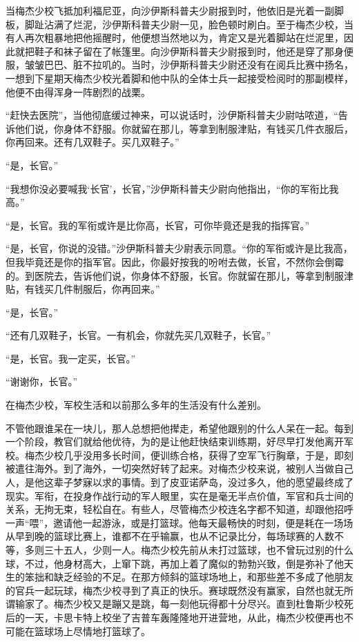     当梅杰少校飞抵加利福尼亚，向沙伊斯科普夫少尉报到时，他依旧是光着一副脚板，脚趾沾满了烂泥，沙伊斯科普夫少尉一见，脸色顿时刷白。至于梅杰少校，当有人再次粗暴地把他摇醒时，他便想当然地以为，肯定又是光着脚站在烂泥里，因此就把鞋子和袜子留在了帐篷里。向沙伊斯科普夫少尉报到时，他还是穿了那身便服，皱皱巴巴、脏不拉叽的。当时，沙伊斯科普夫少尉还没有在阅兵比赛中扬名，一想到下星期天梅杰少校光着脚和他中队的全体士兵一起接受检阅时的那副模样，他便不由得浑身一阵剧烈的战栗。

    “赶快去医院”，当他彻底缓过神来，可以说话时，沙伊斯科普夫少尉咕哝道，“告诉他们说，你身体不舒服。你就留在那儿，等拿到制服津贴，有钱买几件衣服后，你再回来。还有几双鞋子。买几双鞋子。”

    “是，长官。”

    “我想你没必要喊我‘长官’，长官，”沙伊斯科普夫少尉向他指出，“你的军衔比我高。”

    “是，长官。我的军衔或许是比你高，长官，可你毕竟还是我的指挥官。”

    “是，长官，你说的没错。”沙伊斯科普夫少尉表示同意。“你的军衔或许是比我高，但我毕竟还是你的指军官。因此，你最好按我的吩咐去做，长官，不然你会倒霉的。到医院去，告诉他们说，你身体不舒服，长官。你就留在那儿，等拿到制服津贴，有钱买几件制服后，你再回来。”

    “是，长官。”

    “还有几双鞋子，长官。一有机会，你就先买几双鞋子，长官。”

    “是，长官。我一定买，长官。”

    “谢谢你，长官。”

    在梅杰少校，军校生活和以前那么多年的生活没有什么差别。

    不管他跟谁呆在一块儿，那人总想把他撵走，希望他跟别的什么人呆在一起。每到一个阶段，教官们就给他优待，为的是让他赶快结束训练期，好尽早打发他离开军校。梅杰少校几乎没用多长时间，便训练合格，获得了空军飞行胸章，于是，即刻被遣往海外。到了海外，一切突然好转了起来。对梅杰少校来说，被别人当做自己人，是他这辈子梦寐以求的事情。到了皮亚诺萨岛，没过多久，他的愿望最终成了现实。军衔，在投身作战行动的军人眼里，实在是毫无半点价值，军官和兵士间的关系，无拘无束，轻松自在。有些人，尽管梅杰少校连名字都不知道，却跟他招呼一声“喂”，邀请他一起游泳，或是打篮球。他每天最畅快的时刻，便是耗在一场场从早到晚的篮球比赛上，谁都不在乎输赢，也从不记录比分，每场球赛的人数不等，多则三十五人，少则一人。梅杰少校先前从未打过篮球，也不曾玩过别的什么球，不过，他身材高大，上窜下跳，再加上着了魔似的勃勃兴致，倒是弥补了他天生的笨拙和缺乏经验的不足。在那方倾斜的篮球场地上，和那些差不多成了他朋友的官兵一起玩球，梅杰少校寻到了真正的快乐。赛球既然没有赢家，自然也就无所谓输家了。梅杰少校又是蹦又是跳，每一刻他玩得都十分尽兴。直到杜鲁斯少校死后的一天，卡思卡特上校坐了吉普车轰隆隆地开进营地，从此，梅杰少校便再也不可能在篮球场上尽情地打篮球了。

